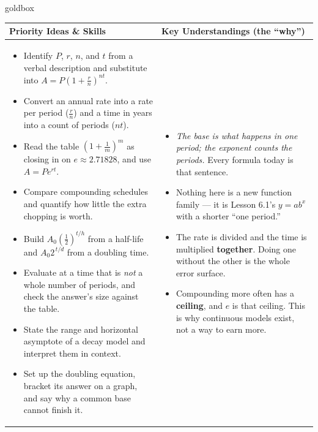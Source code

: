 \documentclass[10pt]{article}
\begin{document}
\renewcommand{\arraystretch}{1.4}
\begin{skillbox}{goldbox}
\begin{tabularx}{\linewidth}{@{}X|X@{}}
\textbf{Priority Ideas \& Skills} & \textbf{Key Understandings (the ``why'')} \\[2pt]
\hline
\vspace{-6pt}
\begin{itemize}[leftmargin=1.1em, nosep, after=\vspace{2pt}]
  \item Identify $P$, $r$, $n$, and $t$ from a verbal description and substitute into $A=P\left(1+\frac{r}{n}\right)^{nt}$.
  \item Convert an annual rate into a rate per period ($\frac{r}{n}$) and a time in years into a count of periods ($nt$).
  \item Read the table $\left(1+\frac1m\right)^{m}$ as closing in on $e\approx2.71828$, and use $A=Pe^{rt}$.
  \item Compare compounding schedules and quantify how little the extra chopping is worth.
  \item Build $A_{0}\left(\frac12\right)^{t/h}$ from a half-life and $A_{0}2^{\,t/d}$ from a doubling time.
  \item Evaluate at a time that is \emph{not} a whole number of periods, and check the answer's size against the table.
  \item State the range and horizontal asymptote of a decay model and interpret them in context.
  \item Set up the doubling equation, bracket its answer on a graph, and say why a common base cannot finish it.
\end{itemize}
&
\vspace{-6pt}
\begin{itemize}[leftmargin=1.1em, nosep, after=\vspace{2pt}]
  \item \emph{The base is what happens in one period; the exponent counts the periods.} Every formula today is that sentence.
  \item Nothing here is a new function family --- it is Lesson 6.1's $y=ab^{x}$ with a shorter ``one period.''
  \item The rate is divided and the time is multiplied \textbf{together}. Doing one without the other is the whole error surface.
  \item Compounding more often has a \textbf{ceiling}, and $e$ is that ceiling. This is why continuous models exist, not a way to earn more.

\end{itemize}
\end{tabularx}
\end{skillbox}
\end{document}
